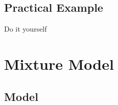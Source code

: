 \documentclass{beamer}\usepackage[]{graphicx}\usepackage[]{color}
\begin{document}
\subsection*{Practical Example}
\begin{frame}[fragile]{Do it yourself}
\end{frame}
\section{Mixture Model}

\subsection{Model}
\end{document}
